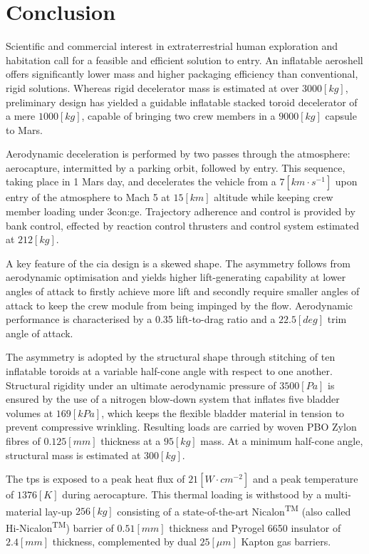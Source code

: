 \section{Conclusion}

Scientific and commercial interest in extraterrestrial human exploration and habitation call for a feasible and efficient solution to entry. An inflatable aeroshell offers significantly lower mass and higher packaging efficiency than conventional, rigid solutions. Whereas rigid decelerator mass is estimated at over $3000 \left[kg\right] $, preliminary design has yielded a guidable inflatable stacked toroid decelerator of a mere $1000 \left[kg\right]$, capable of bringing two crew members in a $9000 \left[kg\right]$ capsule to Mars.

Aerodynamic deceleration is performed by two passes through the atmosphere: aerocapture, intermitted by a parking orbit, followed by entry. This sequence, taking place in 1 Mars day, and decelerates the vehicle from a $7 \left[km\cdot s^{-1}\right]$ upon entry of the atmosphere to Mach 5 at $15 \left[km\right]$ altitude while keeping crew member loading under 3\gls{con:ge}. Trajectory adherence and control is provided by bank control, effected by reaction control thrusters and control system estimated at $212 \left[kg\right]$.

A key feature of the \gls{cia} design is a skewed shape. The asymmetry follows from aerodynamic optimisation and yields higher lift-generating capability at lower angles of attack to firstly achieve more lift and secondly require smaller angles of attack to keep the crew module from being impinged by the flow. Aerodynamic performance is characterised by a 0.35 lift-to-drag ratio and a $22.5 \left[deg\right]$ trim angle of attack.

The asymmetry is adopted by the structural shape through stitching of ten inflatable toroids at a variable half-cone angle with respect to one another. Structural rigidity under an ultimate aerodynamic pressure of $3500 \left[Pa\right]$ is ensured by the use of a nitrogen blow-down system that inflates five bladder volumes at $169 \left[kPa\right]$, which keeps the flexible bladder material in tension to prevent compressive wrinkling. Resulting loads are carried by woven PBO Zylon\textsuperscript{\textregistered} fibres of $0.125 \left[mm\right]$ thickness at a $95 \left[kg\right]$ mass. At a minimum half-cone angle, structural mass is estimated at $300 \left[kg\right]$. 

The \acrlong{tps} is exposed to a peak heat flux of $21 \left[W\cdot cm^{-2}\right]$ and a peak temperature of $1376 \left[ K \right] $ during aerocapture. This thermal loading is withstood by a multi-material lay-up $256 \left[ kg \right] $ consisting of a state-of-the-art Nicalon\textsuperscript{TM} (also called Hi-Nicalon\textsuperscript{TM}) barrier of $0.51 \left[ mm \right] $  thickness and Pyrogel\textsuperscript{\textregistered} 6650 insulator of $2.4 \left[ mm \right] $  thickness, complemented by dual $25 \left[ \mu m \right] $  Kapton gas barriers. 

